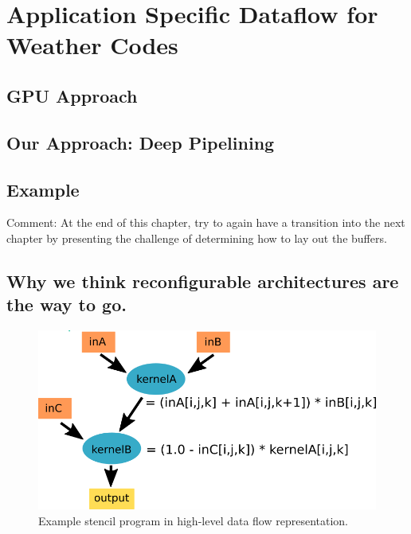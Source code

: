 \chapter{Application Specific Dataflow for Weather Codes}



\section{GPU Approach}



\section{Our Approach: Deep Pipelining}


\section{Example}
Comment: At the end of this chapter, try to again have a transition into the next chapter by presenting the challenge of determining how to lay out the buffers.




\section{{Why we think reconfigurable architectures are the way to go.}}




\begin{figure}[h]
	\centering
	\includegraphics[width=1.0\textwidth]{drawings/approach-stencil-program.png}
	\caption{Example stencil program in high-level data flow representation.}
	\label{fig:mesh1}
\end{figure}

